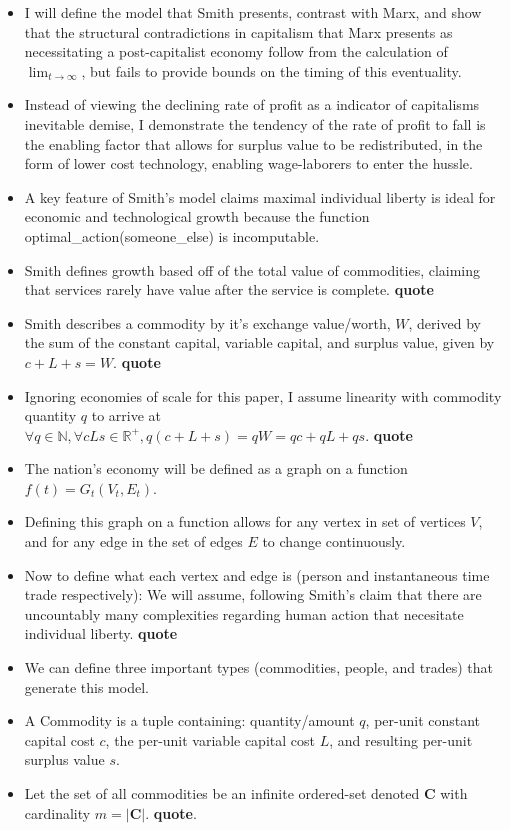 \documentclass[12pt]{article}
\begin{document}
\begin{itemize}
    \item I will define the model that Smith presents, contrast with Marx, and show that the structural contradictions in capitalism that Marx presents as necessitating a post-capitalist economy follow from the calculation of $\lim_{t \to \infty}$, but fails to provide bounds on the timing of this eventuality. 
    \item Instead of viewing the declining rate of profit as a indicator of capitalisms inevitable demise, I demonstrate the tendency of the rate of profit to fall is the enabling factor that allows for surplus value to be redistributed, in the form of lower cost technology, enabling wage-laborers to enter the hussle.
    \item A key feature of Smith's model claims maximal individual liberty is ideal for economic and technological growth because the function optimal\_action(someone\_else) is incomputable. 
    \item Smith defines growth based off of the total value of commodities, claiming that services rarely have value after the service is complete. \textbf{quote}
    \item Smith describes a commodity by it's exchange value/worth, $W$, derived by the sum of the constant capital, variable capital, and surplus value, given by $c + L + s = W$. \textbf{quote}
    \item Ignoring economies of scale for this paper, I assume linearity with commodity quantity $q$ to arrive at $\forall q \in \mathbb{N}, \forall{cLs} \in \mathbb{R^{+}}, q(c + L + s) = qW = qc + qL + qs $. \textbf{quote}
    \item The nation's economy will be defined as a graph on a function $f(t) = G_t(V_t, E_t)$. 
    \item Defining this graph on a function allows for any vertex in set of vertices $V$, and for any edge in the set of edges $E$ to change continuously.
    \item Now to define what each vertex and edge is (person and instantaneous time trade respectively): We will assume, following Smith's claim that there are uncountably many complexities regarding human action that necesitate individual liberty. \textbf{quote} 
    \item We can define three important types (commodities, people, and trades) that generate this model. 
    \item A Commodity is a tuple containing: quantity/amount $q$, per-unit constant capital cost $c$, the per-unit variable capital cost $L$, and resulting per-unit surplus value $s$. 
    \item Let the set of all commodities be an infinite ordered-set denoted $\boldsymbol{C}$ with cardinality $m = |\boldsymbol{C}|$. \textbf{quote}.
    

\end{itemize}
\end{document}
